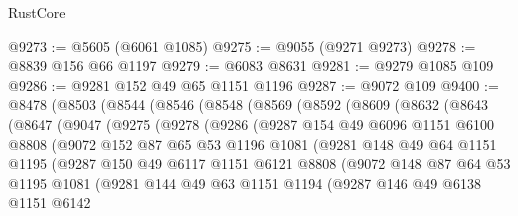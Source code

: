\begin{lexlean}{RustCore}
\begin{coremodule}
@9273 := @5605 (@6061 @1085)
@9275 := @9055 (@9271 @9273)
@9278 := @8839 @156 @66 @1197
@9279 := @6083 @8631
@9281 := @9279 @1085 @109
@9286 := @9281 @152 @49 @65 @1151 @1196
@9287 := @9072 @109
@9400 := @8478
    (@8503
      (@8544
        (@8546
          (@8548
            (@8569
              (@8592
                (@8609
                  (@8632
                    (@8643
                      (@8647
                        (@9047
                          (@9275
                            (@9278
                              (@9286
                                (@9287
                                  @154
                                  @49
                                  @6096
                                  @1151
                                  @6100
                                  @8808
                                  (@9072
                                    @152
                                    @87
                                    @65
                                    @53
                                    @1196
                                    @1081
                                    (@9281
                                      @148
                                      @49
                                      @64
                                      @1151
                                      @1195
                                      (@9287
                                        @150
                                        @49
                                        @6117
                                        @1151
                                        @6121
                                        @8808
                                        (@9072
                                          @148
                                          @87
                                          @64
                                          @53
                                          @1195
                                          @1081
                                          (@9281
                                            @144
                                            @49
                                            @63
                                            @1151
                                            @1194
                                            (@9287
                                              @146
                                              @49
                                              @6138
                                              @1151
                                              @6142

\end{coremodule}
\end{lexlean}
